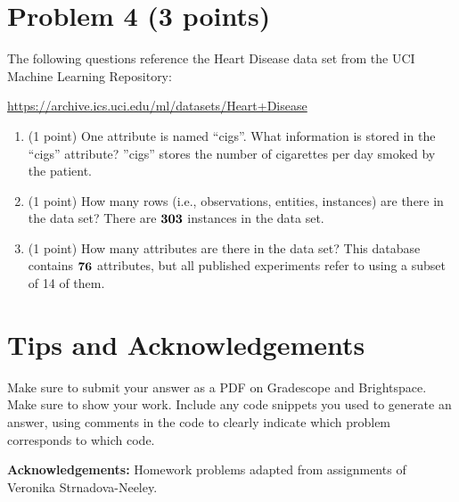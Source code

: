 \documentclass[11pt]{article}
\begin{document}
\section*{Problem 4 (3 points)}

The following questions reference the Heart Disease data set from the UCI
Machine Learning Repository:

\url{https://archive.ics.uci.edu/ml/datasets/Heart+Disease}

\begin{enumerate}
    \item (1 point) One attribute is named ``cigs''.  What information is stored
    in the ``cigs'' attribute?
    \newline
    \newline ''cigs'' stores the number of cigarettes per day smoked by the patient.
    \item (1 point) How many rows (i.e., observations, entities, instances) are
    there in the data set?
    \newline
    \newline There are $\bf{303}$ instances in the data set.
    \item (1 point) How many attributes are there in the data set?
    \newline
    \newline This database contains $\bf{76}$ attributes, but all published experiments refer to using a subset of 14 of them.
    \end{enumerate}

\section*{Tips and Acknowledgements}

Make sure to submit your answer as a PDF on Gradescope and Brightspace. Make sure
to show your work. Include any code snippets you used to generate an answer,
using comments in the code to clearly indicate which problem corresponds to
which code.


{\bf Acknowledgements:} Homework problems adapted from assignments of
Veronika Strnadova-Neeley.
\end{document}
